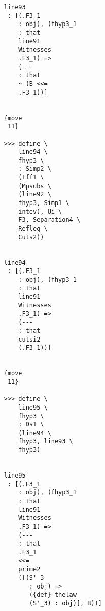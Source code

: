 \documentclass[12pt]{article}
\begin{document}
\begin{verbatim}
                                    line93 
                                     : [(.F3_1 
                                        : obj), (fhyp3_1 
                                        : that 
                                        line91 
                                        Witnesses 
                                        .F3_1) => 
                                        (--- 
                                        : that 
                                        ~ (B <<= 
                                        .F3_1))]


                                    {move 
                                     11}

                                    >>> define \
                                        line94 \
                                        fhyp3 \
                                        : Simp2 \
                                        (Iff1 \
                                        (Mpsubs \
                                        (line92 \
                                        fhyp3, Simp1 \
                                        intev), Ui \
                                        F3, Separation4 \
                                        Refleq \
                                        Cuts2))


                                    line94 
                                     : [(.F3_1 
                                        : obj), (fhyp3_1 
                                        : that 
                                        line91 
                                        Witnesses 
                                        .F3_1) => 
                                        (--- 
                                        : that 
                                        cutsi2 
                                        (.F3_1))]


                                    {move 
                                     11}

                                    >>> define \
                                        line95 \
                                        fhyp3 \
                                        : Ds1 \
                                        (line94 \
                                        fhyp3, line93 \
                                        fhyp3)


                                    line95 
                                     : [(.F3_1 
                                        : obj), (fhyp3_1 
                                        : that 
                                        line91 
                                        Witnesses 
                                        .F3_1) => 
                                        (--- 
                                        : that 
                                        .F3_1 
                                        <<= 
                                        prime2 
                                        ([(S'_3 
                                           : obj) => 
                                           ({def} thelaw 
                                           (S'_3) : obj)], B))]



\end{verbatim}
\end{document}

